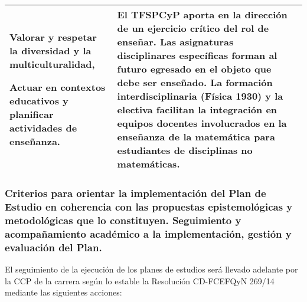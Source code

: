 \documentclass[a4paper, 12pt]{article}
\begin{document}
\begin{center}
\begin{xltabular}{1.0\textwidth}{|>{\raggedright\arraybackslash}X |
>{\raggedright\arraybackslash}X |
>{\raggedright\arraybackslash}X |
}
 Valorar y respetar la diversidad y la multiculturalidad,
 
 
 Actuar en contextos educativos y planificar actividades de enseñanza.

  
  
  &  El TFSPCyP aporta en la dirección de un ejercicio crítico del rol de enseñar. Las asignaturas disciplinares específicas forman al futuro egresado en el objeto que debe ser enseñado. La formación interdisciplinaria (Física 1930) y la electiva  facilitan la integración en equipos docentes involucrados en la enseñanza de la matemática para estudiantes de disciplinas no matemáticas. \\ \hline
  
 
\end{xltabular}
\end{center}
\normalsize


\subsubsection{Criterios para orientar la implementación del Plan de Estudio en coherencia con las propuestas epistemológicas y metodológicas que lo constituyen. Seguimiento y acompañamiento académico a la implementación, gestión y evaluación del Plan.
} 
 

El seguimiento de la ejecución de los planes de estudios será llevado adelante por la CCP de la carrera según lo estable  la Resolución CD-FCEFQyN 269/14 mediante las siguientes acciones:
\end{document}
